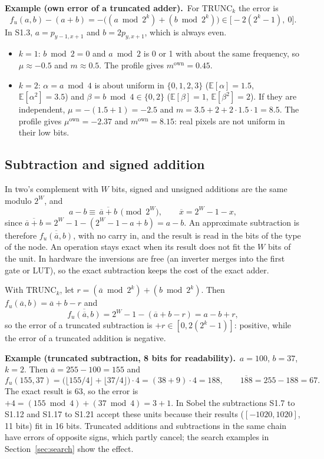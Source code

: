 \documentclass[11pt,a4paper]{article}
\newcommand{\E}{\mathbb{E}}
\newcommand{\examplebox}[2]{\par\medskip\noindent\colorbox{tabAzul!6}{\begin{minipage}{\dimexpr\linewidth-2\fboxsep}
  \textbf{Example (#1).}\ #2\end{minipage}}\par\medskip}
\begin{document}
\examplebox{own error of a truncated adder}{For $\text{TRUNC}_k$ the error is
\[
  f_u(a, b) - (a + b) = -\big( (a \bmod 2^k) + (b \bmod 2^k) \big) \in \big[ -2(2^k - 1),\ 0 \big].
\]
In S1.3, $a = p_{y-1,x+1}$ and $b = 2p_{y,x+1}$, which is always even.
\begin{itemize}
  \item $k = 1$: $b \bmod 2 = 0$ and $a \bmod 2$ is 0 or 1 with about the same frequency, so $\mu \approx -0.5$ and
    $m \approx 0.5$. The profile gives $m^{\text{own}} = 0.45$.
  \item $k = 2$: $\alpha = a \bmod 4$ is about uniform in $\{0,1,2,3\}$ ($\E[\alpha] = 1.5$, $\E[\alpha^2] = 3.5$)
    and $\beta = b \bmod 4 \in \{0, 2\}$ ($\E[\beta] = 1$, $\E[\beta^2] = 2$). If they are independent,
    $\mu = -(1.5 + 1) = -2.5$ and $m = 3.5 + 2 + 2 \cdot 1.5 \cdot 1 = 8.5$. The profile gives
    $\mu^{\text{own}} = -2.37$ and $m^{\text{own}} = 8.15$: real pixels are not uniform in their low bits.
\end{itemize}}

\subsection{Subtraction and signed addition}

In two's complement with $W$ bits, signed and unsigned additions are the same modulo $2^W$, and
\[
  a - b \equiv \overline{\,\overline{a} + b\,} \pmod{2^W}, \qquad \overline{x} = 2^W - 1 - x,
\]
since $\overline{\overline{a} + b} = 2^W - 1 - (2^W - 1 - a + b) = a - b$. An approximate subtraction is therefore
$\overline{f_u(\overline{a}, b)}$, with no carry in, and the result is read in the bits of the type of the node. An
operation stays exact when its result does not fit the $W$ bits of the unit. In hardware the inversions are free (an
inverter merges into the first gate or LUT), so the exact subtraction keeps the cost of the exact adder.

With $\text{TRUNC}_k$, let $r = (\overline{a} \bmod 2^k) + (b \bmod 2^k)$. Then
$f_u(\overline{a}, b) = \overline{a} + b - r$ and
\[
  \overline{f_u(\overline{a}, b)} = 2^W - 1 - (\overline{a} + b - r) = a - b + r ,
\]
so the error of a truncated subtraction is $+r \in [0, 2(2^k - 1)]$: positive, while the error of a truncated
addition is negative.

\examplebox{truncated subtraction, 8 bits for readability}{$a = 100$, $b = 37$, $k = 2$. Then
$\overline{a} = 255 - 100 = 155$ and
\[
  f_u(155, 37) = \big(\lfloor 155/4 \rfloor + \lfloor 37/4 \rfloor\big) \cdot 4 = (38 + 9) \cdot 4 = 188, \qquad
  \overline{188} = 255 - 188 = 67 .
\]
The exact result is $63$, so the error is $+4 = (155 \bmod 4) + (37 \bmod 4) = 3 + 1$. In Sobel the subtractions
S1.7 to S1.12 and S1.17 to S1.21 accept these units because their results ($[-1020, 1020]$, 11 bits) fit in 16 bits.
Truncated additions and subtractions in the same chain have errors of opposite signs, which partly cancel; the
search examples in Section~\ref{sec:search} show the effect.}
\end{document}

